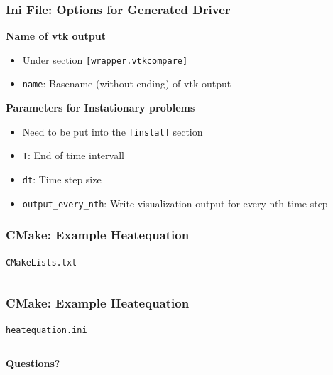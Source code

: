 \documentclass[ignorenonframetext,11pt]{beamer}
\theoremstyle{definition}
\begin{document}
\begin{frame}[fragile]
  \frametitle{Ini File: Options for Generated Driver}
  \vfill
  \textbf{Name of vtk output}
  \begin{itemize}
  \item Under section \lstinline{[wrapper.vtkcompare]}
  \item \lstinline{name}: Basename (without ending) of vtk output
  \end{itemize}
  \vfill
  \textbf{Parameters for Instationary problems}
  \begin{itemize}
  \item Need to be put into the \lstinline{[instat]} section
  \item \lstinline{T}: End of time intervall
  \item \lstinline{dt}: Time step size
  \item \lstinline{output_every_nth}: Write visualization output for every nth time
    step
  \end{itemize}
  \vfill
\end{frame}

\begin{frame}[fragile]
  \frametitle{CMake: Example Heatequation}

  
  \lstinline{CMakeLists.txt}
  \inputminted[fontsize=\tiny, firstline=3, lastline=9]{cmake}{../src/CMakeLists.txt}
\end{frame}

\begin{frame}
  \frametitle{CMake: Example Heatequation}
  \lstinline{heatequation.ini}
  \inputminted[fontsize=\tiny]{ini}{../src/heatequation.ini}
\end{frame}

\begin{frame}
  \vfill
  \centering
  \textbf{Questions?}
  \vfill
\end{frame}
\end{document}
